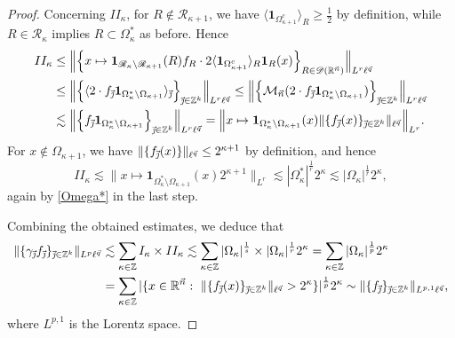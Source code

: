\documentclass[11pt, reqno]{amsart}
\theoremstyle{definition}
\theoremstyle{remark}
\numberwithin{equation}{section}
\newcommand{\R}{\mathbb R}
\newcommand{\Rs}{\mathscr R}
\newcommand{\Z}{\mathbb Z}
\newcommand{\vj}{\vec{\textit{\j}}}
\newcommand{\vn}{\vec n}
\newcommand{\vq}{\vec q}
\newcommand{\one}{\mathbf{1}}
\newcommand{\ave}[1]{\langle #1\rangle}
\newcommand{\Avee}[2]{\langle#1\rangle_{#2}}
\newcommand{\abs}[1]{|#1|}
\newcommand{\Norm}[2]{\|#1\|_{#2}}
\newcommand{\BNorm}[2]{\Big\|#1\Big\|_{#2}}
\begin{document}
\begin{proof}
Concerning $II_\kappa$, for $R\notin\Rs_{\kappa+1}$,
we have $\ave{\one_{\Omega_{\kappa+1}^c}}_R\geq\frac12$ by definition,
while $R\in\Rs_{\kappa}$ implies $R\subset\Omega_{\kappa}^*$ as before. Hence
\begin{align*}
II_\kappa
&\leq\BNorm{\Big\{x\mapsto \one_{\Rs_\kappa\setminus\Rs_{\kappa+1}}(R)f_{R}\cdot 2\ave{\one_{\Omega_{\kappa+1}^c}}_R\one_R(x)\Big\}_{R\in\mathscr D(\mathbb R^{\vn})}}{L^r\ell^{\vq}}  \\
&\leq \BNorm{\Big\{\Avee{2\cdot f_{\vj}\one_{\Omega_\kappa^*\setminus\Omega_{\kappa+1}}}{\vj}\Big\}_{\vj\in\mathbb Z^k}}{L^r\ell^{\vq}}
\leq \BNorm{\Big\{\mathcal M_{\vn}(2\cdot f_{\vj}\one_{\Omega_\kappa^*\setminus\Omega_{\kappa+1}}) \Big\}_{\vj\in\mathbb Z^k}}{L^r\ell^{\vq}} \\
&\lesssim\BNorm{\Big\{ f_{\vj}\one_{\Omega_\kappa^*\setminus\Omega_{\kappa+1}} \Big\}_{\vj\in\mathbb Z^k}}{L^r\ell^{\vq}}
=\BNorm{x\mapsto \one_{\Omega_\kappa^*\setminus\Omega_{\kappa+1}}(x) \Norm{\{ f_{\vj}(x) \}_{\vj\in\mathbb Z^k} }{\ell^{\vq} } }{L^r}.
\end{align*}
For $x\notin\Omega_{\kappa+1}$, we have $ \Norm{\{ f_{\vj}(x) \} }{\ell^{\vq} }\leq 2^{\kappa+1}$ by definition, and hence
\begin{equation*}
II_{\kappa}
\lesssim \BNorm{x\mapsto \one_{\Omega_\kappa^*\setminus\Omega_{\kappa+1}}(x)  2^{\kappa+1} }{L^r}
\lesssim \abs{\Omega_\kappa^*}^{\frac 1r}2^\kappa
\lesssim \abs{\Omega_\kappa}^{\frac 1r}2^\kappa,
\end{equation*}
again by \eqref{Omega*} in the last step.

Combining the obtained estimates, we deduce that
\begin{equation}\label{carl 12}
\begin{split}
  \Norm{\{\gamma_{\vj}f_{\vj}\}_{\vj\in\mathbb Z^k}}{L^p\ell^{\vq}}
  &\lesssim\sum_{\kappa\in\Z}I_\kappa\times II_\kappa
  \lesssim\sum_{\kappa\in\Z}\abs{\Omega_\kappa}^{\frac 1s}\times\abs{\Omega_\kappa}^{\frac 1r} 2^\kappa
  =\sum_{\kappa\in\Z}\abs{\Omega_\kappa}^{\frac 1p} 2^\kappa \\
  &=\sum_{\kappa\in\Z}\abs{\{x\in\R^{\vn}:\
  \Norm{\{f_{\vj}(x)\}_{\vj\in\mathbb Z^k}}{\ell^{\vq}}>2^\kappa\}}^{\frac 1p} 2^\kappa
  \sim\Norm{\{f_{\vj}\}_{\vj\in\mathbb Z^k}}{L^{p,1}\ell^{\vq}},
\end{split}
\end{equation}
where $L^{p,1}$ is the Lorentz space.


\end{proof}
\end{document}
